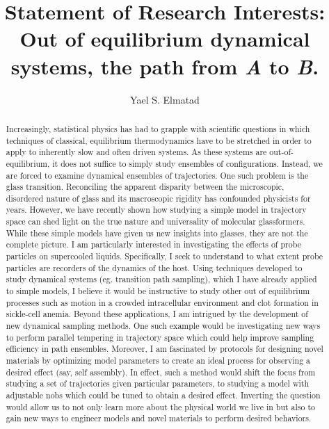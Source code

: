 \documentclass[11pt]{article}
\title{{{\textbf{Statement of Research Interests}}: \\Out of equilibrium dynamical systems, the path from \textit{A} to \textit{B}.}}
\author{Yael S. Elmatad}
\date{}                                           %
\begin{document}
\maketitle
%
\begin{abstract}
Increasingly, statistical physics has had to grapple with scientific questions in which techniques of classical, equilibrium thermodynamics have to be stretched in order to apply to inherently slow and often driven systems.   As these systems are out-of-equilibrium, it does not suffice to simply study ensembles of configurations. Instead, we are forced to examine dynamical ensembles of trajectories.  One such problem is the glass transition.  Reconciling the apparent disparity between the microscopic, disordered nature of glass and its macroscopic rigidity has confounded physicists for years. However, we have recently shown how studying a simple model in trajectory space can shed light on the true nature and universality of molecular glassformers.  While these simple models have given us new insights into glasses, they are not the complete picture. I am particularly interested in investigating the effects of probe particles on supercooled liquids.  Specifically, I seek to understand to what extent probe particles are recorders of the dynamics of the host.  Using techniques developed to study dynamical systems (eg. transition path sampling), which I have already applied to simple models, I believe it would be instructive to study other out of equilibrium processes such as motion in a crowded intracellular environment and clot formation in sickle-cell anemia.  Beyond these applications, I am intrigued by the development of new dynamical sampling methods.  One such example would be investigating new ways to perform parallel tempering in trajectory space which could help improve sampling efficiency in path ensembles.  Moreover, I am fascinated by protocols for designing novel materials by optimizing model parameters to create an ideal process for observing a desired effect (say, self assembly).  In effect, such a method would shift the focus from studying a set of trajectories given particular parameters, to studying a model with adjustable nobs which could be tuned to obtain a desired effect. Inverting the question would allow us to not only learn more about the physical world we live in but also to gain new ways to engineer models and novel materials to perform desired behaviors.



\end{abstract}
\end{document}
